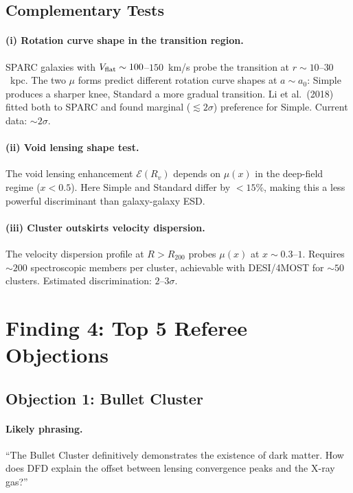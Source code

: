 \documentclass[11pt,a4paper]{article}
\begin{document}
\subsection{Complementary Tests}

\paragraph{(i) Rotation curve shape in the transition region.}
SPARC galaxies with $V_{\rm flat} \sim 100$--$150$~km/s probe the transition
at $r \sim 10$--$30$~kpc.  The two $\mu$ forms predict different rotation
curve shapes at $a \sim a_0$: Simple produces a sharper knee, Standard a
more gradual transition.  Li et al.\ (2018) fitted both to SPARC and found
marginal ($\lesssim 2\sigma$) preference for Simple.  Current data: $\sim 2\sigma$.

\paragraph{(ii) Void lensing shape test.}
The void lensing enhancement $\mathcal{E}(R_v)$ depends on $\mu(x)$ in the
deep-field regime ($x < 0.5$).  Here Simple and Standard differ by $< 15\%$,
making this a less powerful discriminant than galaxy-galaxy ESD.

\paragraph{(iii) Cluster outskirts velocity dispersion.}
The velocity dispersion profile at $R > R_{200}$ probes $\mu(x)$ at $x \sim 0.3$--$1$.
Requires $\sim 200$ spectroscopic members per cluster, achievable with DESI/4MOST
for $\sim 50$ clusters.  Estimated discrimination: $2$--$3\sigma$.


\section{Finding 4: Top 5 Referee Objections}
\label{sec:referee}

\subsection{Objection 1: Bullet Cluster}

\paragraph{Likely phrasing.}
``The Bullet Cluster definitively demonstrates the existence of dark matter.
How does DFD explain the offset between lensing convergence peaks and the
X-ray gas?''
\end{document}
